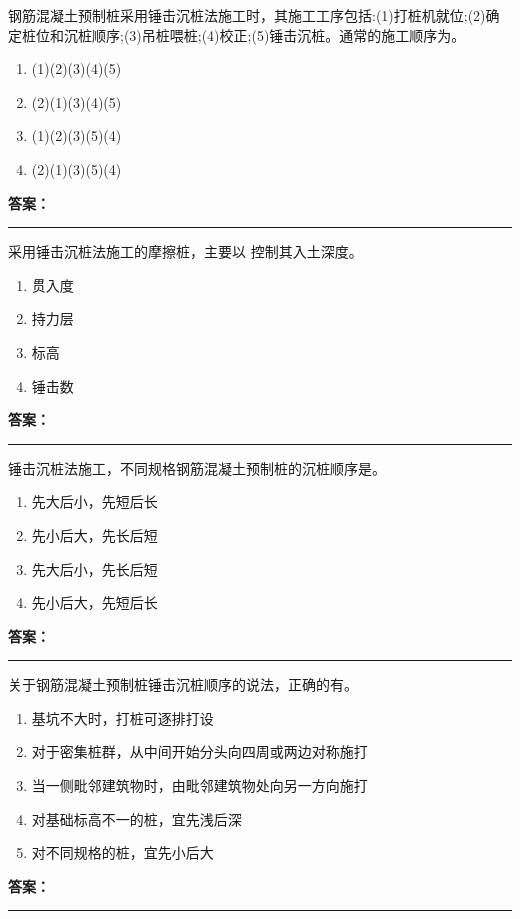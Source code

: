 \documentclass[UTF8,fontset=fandol,11pt]{ctexart}
\newcommand{\answerline}{\textcolor{answerred}{\rule{2.4cm}{0.7pt}}}
\begin{document}
\begin{quizbox}[title={第 7 题}]
钢筋混凝土预制桩采用锤击沉桩法施工时，其施工工序包括:(1)打桩机就位;(2)确定桩位和沉桩顺序;(3)吊桩喂桩;(4)校正;(5)锤击沉桩。通常的施工顺序为。\\
\begin{enumerate}[label=\Alph*.]
\item (1)(2)(3)(4)(5)
\item (2)(1)(3)(4)(5)
\item (1)(2)(3)(5)(4)
\item (2)(1)(3)(5)(4)
\end{enumerate}
\textbf{\textcolor{answerred}{答案：}} \answerline
\end{quizbox}

\begin{quizbox}[title={第 8 题}]
采用锤击沉桩法施工的摩擦桩，主要以 控制其入土深度。\\
\begin{enumerate}[label=\Alph*.]
\item 贯入度
\item 持力层
\item 标高
\item 锤击数
\end{enumerate}
\textbf{\textcolor{answerred}{答案：}} \answerline
\end{quizbox}

\begin{quizbox}[title={第 9 题}]
锤击沉桩法施工，不同规格钢筋混凝土预制桩的沉桩顺序是。\\
\begin{enumerate}[label=\Alph*.]
\item 先大后小，先短后长
\item 先小后大，先长后短
\item 先大后小，先长后短
\item 先小后大，先短后长
\end{enumerate}
\textbf{\textcolor{answerred}{答案：}} \answerline
\end{quizbox}

\begin{quizbox}[title={第 10 题}]
关于钢筋混凝土预制桩锤击沉桩顺序的说法，正确的有。\\
\begin{enumerate}[label=\Alph*.]
\item 基坑不大时，打桩可逐排打设
\item 对于密集桩群，从中间开始分头向四周或两边对称施打
\item 当一侧毗邻建筑物时，由毗邻建筑物处向另一方向施打
\item 对基础标高不一的桩，宜先浅后深
\item 对不同规格的桩，宜先小后大
\end{enumerate}
\textbf{\textcolor{answerred}{答案：}} \answerline
\end{quizbox}
\end{document}
